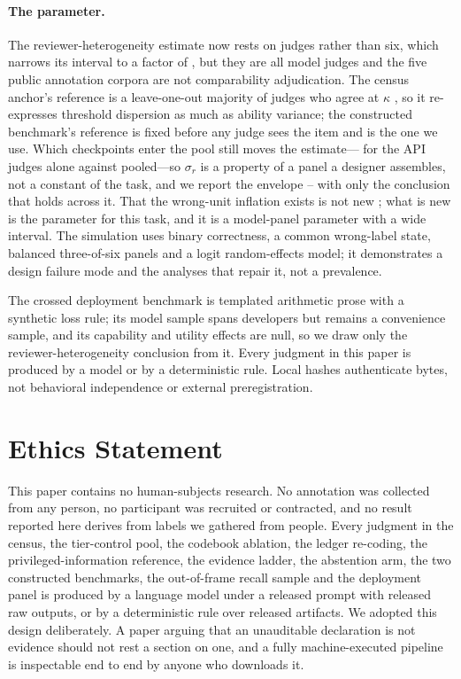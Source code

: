 \documentclass[11pt]{article}
\begin{document}
\paragraph{The parameter.}
The reviewer-heterogeneity estimate now rests on \OwjNTotal{} judges rather
than six, which narrows its interval to a factor of \OwjSigRatio{}, but they are
all model judges and the five public annotation corpora are not comparability
adjudication. The census anchor's reference is a leave-one-out majority of
judges who agree at $\kappa$ \DecVerdictK{}, so it re-expresses threshold
dispersion as much as ability variance; the constructed benchmark's reference is
fixed before any judge sees the item and is the one we use. Which checkpoints
enter the pool still moves the estimate---\OwjSigApi{} for the API judges alone
against \OwjSigPooled{} pooled---so $\sigma_r$ is a property of a panel a
designer assembles, not a constant of the task, and we report the envelope
\SigEnvLo{}--\SigEnvHi{} with only the conclusion that holds across it.
That the wrong-unit inflation exists is not new
\citep{clark1973language,judd2012stimuli}; what is new is the parameter for this
task, and it is a model-panel parameter with a wide interval. The simulation
uses binary correctness, a common wrong-label state, balanced three-of-six
panels and a logit random-effects model; it demonstrates a design failure mode
and the analyses that repair it, not a prevalence.

The crossed deployment benchmark is templated arithmetic prose with a synthetic
loss rule; its model sample spans \CMJdevelopers{} developers but remains a
convenience sample, and its capability and utility effects are null, so we draw
only the reviewer-heterogeneity conclusion from it. Every judgment in this paper
is produced by a model or by a deterministic rule. Local hashes authenticate
bytes, not behavioral independence or external preregistration.

\section*{Ethics Statement}

This paper contains no human-subjects research. No annotation was collected from
any person, no participant was recruited or contracted, and no result reported
here derives from labels we gathered from people. Every judgment in the census,
the tier-control pool, the codebook ablation, the ledger re-coding, the
privileged-information reference, the evidence ladder, the abstention arm, the
two constructed benchmarks, the out-of-frame recall sample and the deployment
panel is produced by a language model under a released prompt with released raw
outputs, or by a deterministic rule over released artifacts. We adopted this
design deliberately. A paper arguing that an unauditable declaration is not
evidence should not rest a section on one, and a fully machine-executed pipeline
is inspectable end to end by anyone who downloads it.
\end{document}
